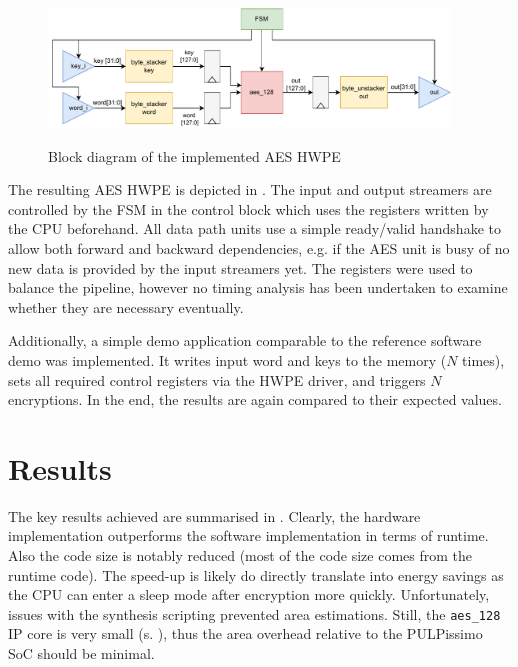 \documentclass[a4paper, 12pt]{article}
\begin{document}
\begin{figure} [h]
	\centering
	\includegraphics[width=0.95\textwidth]{hwpe_aes.pdf}
	\label{hwpe-aes}
	\caption{Block diagram of the implemented AES HWPE}
\end{figure}

The resulting AES HWPE is depicted in . The input and output streamers are controlled by the FSM in the control block which uses the registers written by the CPU beforehand. All data path units use a simple ready/valid handshake to allow both forward and backward dependencies, e.g. if the AES unit is busy of no new data is provided by the input streamers yet. The registers were used to balance the pipeline, however no timing analysis has been undertaken to examine whether they are necessary eventually.

Additionally, a simple demo application comparable to the reference software demo was implemented. It writes input word and keys to the memory ($N$ times), sets all required control registers via the HWPE driver, and triggers $N$ encryptions. In the end, the results are again compared to their expected values.

\section{Results} \label{sec:results}

The key results achieved are summarised in . Clearly, the hardware implementation outperforms the software implementation in terms of runtime. Also the code size is notably reduced (most of the code size comes from the runtime code). The speed-up is likely do directly translate into energy savings as the CPU can enter a sleep mode after encryption more quickly. Unfortunately, issues with the synthesis scripting prevented area estimations. Still, the \verb|aes_128| IP core is very small (s. ), thus the area overhead relative to the PULPissimo SoC should be minimal.
\end{document}
